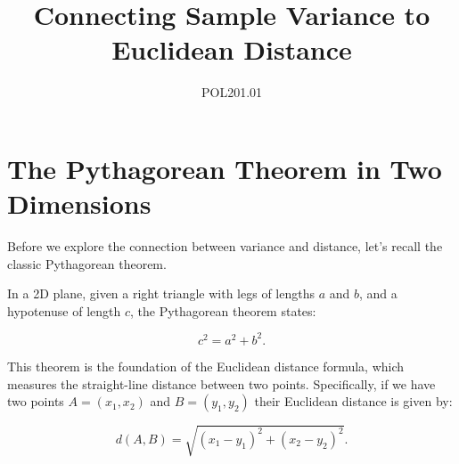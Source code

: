 \documentclass{article}
\begin{document}
\title{Connecting Sample Variance to Euclidean Distance}
\author{POL201.01}
\date{}
\maketitle

\section{The Pythagorean Theorem in Two Dimensions}

Before we explore the connection between variance and distance, let’s recall the classic Pythagorean theorem.

In a 2D plane, given a right triangle with legs of lengths \(a\) and \(b\), and a hypotenuse of length \(c\), the Pythagorean theorem states:

\begin{equation}
    c^2 = a^2 + b^2.
\end{equation}

This theorem is the foundation of the Euclidean distance formula, which measures the straight-line distance between two points. Specifically, if we have two points \(A = (x_1, x_2)\) and \(B = (y_1, y_2)\) their Euclidean distance is given by:

\begin{equation}
    d(A, B) = \sqrt{(x_1 - y_1)^2 + (x_2 - y_2)^2 }.
\end{equation}

\begin{center}
\end{center}
\end{document}
